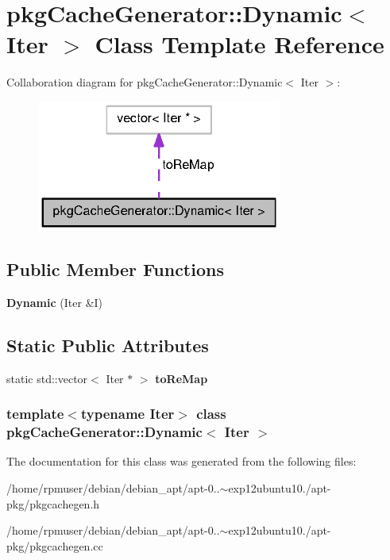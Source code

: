 \section{pkg\-Cache\-Generator\-:\-:\-Dynamic$<$ \-Iter $>$ \-Class \-Template \-Reference}
\label{classpkgCacheGenerator_1_1Dynamic}


\-Collaboration diagram for pkg\-Cache\-Generator\-:\-:\-Dynamic$<$ \-Iter $>$\-:
\nopagebreak
\begin{figure}[H]
\begin{center}
\leavevmode
\includegraphics[width=228pt]{classpkgCacheGenerator_1_1Dynamic__coll__graph}
\end{center}
\end{figure}
\subsection*{\-Public \-Member \-Functions}
\begin{DoxyCompactItemize}
\item 
{\bfseries \-Dynamic} (\-Iter \&\-I)\label{classpkgCacheGenerator_1_1Dynamic_abaee62ef9847b60e3795fa44e7657634}

\end{DoxyCompactItemize}
\subsection*{\-Static \-Public \-Attributes}
\begin{DoxyCompactItemize}
\item 
static std\-::vector$<$ \-Iter $\ast$ $>$ {\bfseries to\-Re\-Map}\label{classpkgCacheGenerator_1_1Dynamic_a05b7e4da937226e6d24f4b079749fb6c}

\end{DoxyCompactItemize}
\subsubsection*{template$<$typename \-Iter$>$ class pkg\-Cache\-Generator\-::\-Dynamic$<$ Iter $>$}



\-The documentation for this class was generated from the following files\-:\begin{DoxyCompactItemize}
\item 
/home/rpmuser/debian/debian\-\_\-apt/apt-\/0..$\sim$exp12ubuntu10./apt-\/pkg/pkgcachegen.\-h\item 
/home/rpmuser/debian/debian\-\_\-apt/apt-\/0..$\sim$exp12ubuntu10./apt-\/pkg/pkgcachegen.\-cc\end{DoxyCompactItemize}
